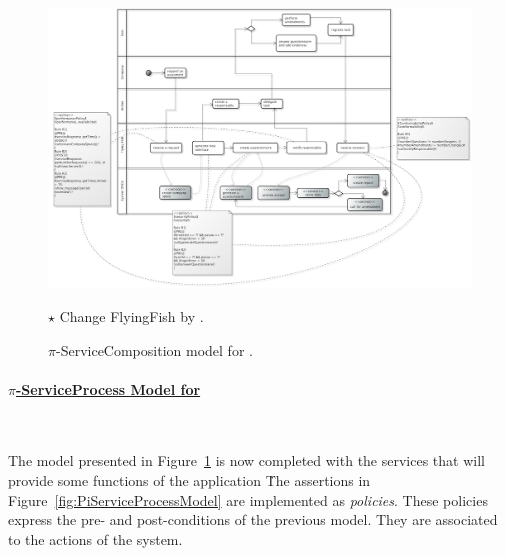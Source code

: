 \begin{figure}[t]
\centering
\includegraphics[width=1.0\textwidth]{figs/ServiceCompositionGeneralCut.png}
{\color{red} \raggedright
$\star$ Change FlyingFish by \FlyingPig.
}
\caption{$\pi$-ServiceComposition model for \FlyingPig.\label{fig:PiServiceCompositionModel}}
\end{figure}

\paragraph{\underline{$\pi$-ServiceProcess Model for \FlyingPig}}~

The model presented in Figure~\ref{fig:PiServiceCompositionModel} 
is now  completed with the services that will provide some functions of the application  \FlyingPig\.
The assertions in Figure~\ref{fig:PiServiceProcessModel} are implemented as \textit{policies}.
These policies express the pre- and post-conditions of the previous model.
They are associated to the actions of the system.


